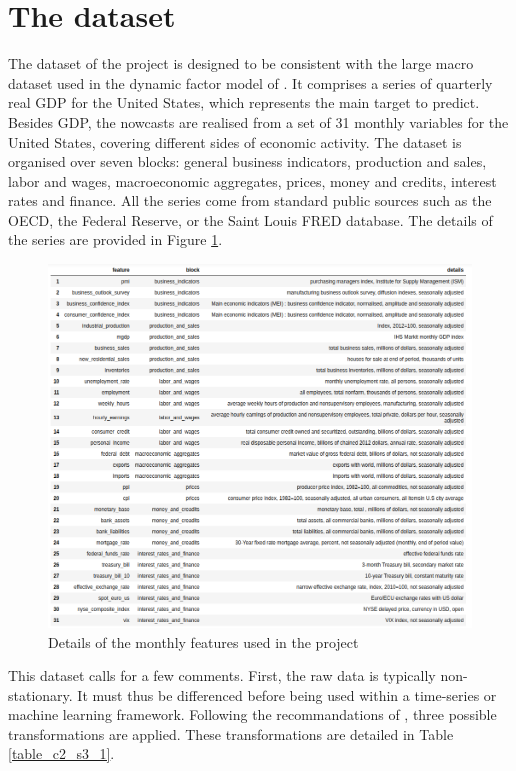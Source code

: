 \section{The dataset}
\label{chapter2_section3}

The dataset of the project is designed to be consistent with the large macro dataset used in the dynamic factor model of \cite{Giannone2008}. It comprises a series of quarterly real GDP for the United States, which represents the main target to predict. Besides GDP, the nowcasts are realised from a set of 31 monthly variables for the United States, covering different sides of economic activity. The dataset is organised over seven blocks: general business indicators, production and sales, labor and wages, macroeconomic aggregates, prices, money and credits, interest rates and finance. All the series come from standard public sources such as the OECD, the Federal Reserve, or the Saint Louis FRED database. The details of the series are provided in Figure \ref{fig_c2_s3_1}.

\begin{figure}[H]
\centering
\includegraphics[scale=0.62]{images/information_dataframe.png}
\caption{Details of the monthly features used in the project}
\label{fig_c2_s3_1}
\end{figure}

This dataset calls for a few comments. First, the raw data is typically non-stationary. It must thus be differenced before being used within a time-series or machine learning framework. Following the recommandations of \cite{Giannone2008}, three possible transformations are applied. These transformations are detailed in Table \ref{table_c2_s3_1}.

